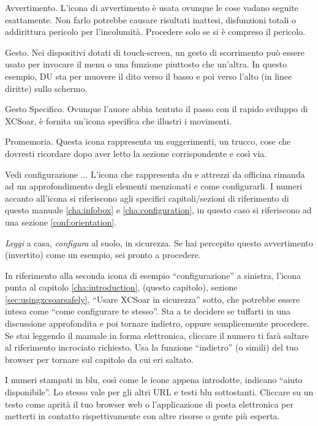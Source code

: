 \warning Avvertimento. L'icona di avvertimento è usata ovunque le cose vadano 
seguite esattamente. Non farlo potrebbe causare risultati inattesi, disfunzioni
totali o addirittura pericolo per l'incolumità. Procedere solo se si è compreso
il pericolo.

 Gesto. Nei dispositivi dotati di touch-screen, un gesto di scorrimento
può essere usato per invocare il menu o una funzione piuttosto che un'altra.
In questo esempio, DU sta per muovere il dito verso il basso e poi verso l'alto
(in linee diritte) sullo schermo.
  
 Gesto Specifico. Ovunque l'auore abbia tentuto il passo con il rapido sviluppo di XCSoar, è fornita un'icona specifica che illustri i movimenti.

\tip Promemoria. Questa icona rappresenta un suggerimenti, un trucco, cose che dovresti ricordare dopo aver letto la sezione corrispondente e così via.

 Vedi configurazione ... L'icona che rappresenta du e attrezzi
da officina rimanda ad un approfondimento degli elementi menzionati e come configurarli. I numeri accanto all'icona si riferiscono agli specifici capitoli/sezioni di riferimento di questo manuale \ref{cha:infobox} e 
\ref{cha:configuration}, in questo caso si riferiscono ad una sezione \ref{conf:orientation}. 


\emph{Leggi} a casa, \emph{configura} al suolo, in sicurezza. Se hai percepito questo avvertimento (invertito) 
come un esempio, sei pronto a procedere.

 In riferimento alla seconda icona di esempio 
``configurazione'' a sinistra, l'icona punta al capitolo \ref{cha:introduction}, (questo capitolo), sezione 
\ref{sec:usingxcsoarsafely}, ``Usare XCSoar in sicurezza'' sotto, che potrebbe essere
intesa come ``come configurare te stesso''. Sta a te decidere se tuffarti in una discussione
approfondita e poi tornare indietro, oppure semplicemente procedere. Se stai leggendo il manuale in 
forma elettronica, cliccare il numero ti farà saltare al riferimento incrociato richiesto.
Usa la funzione ``indietro'' (o simili) del tuo browser per tornare sul capitolo da cui eri saltato.

I numeri stampati in blu, così come le icone appena introdotte, indicano ``aiuto
disponibile''. Lo stesso vale per gli altri URL e testi blu sottostanti.
Cliccare su un testo come  aprità il tuo browser web 
o l'applicazione di posta elettronica per metterti in contatto rispettivamente
con altre risorse o gente più esperta.

